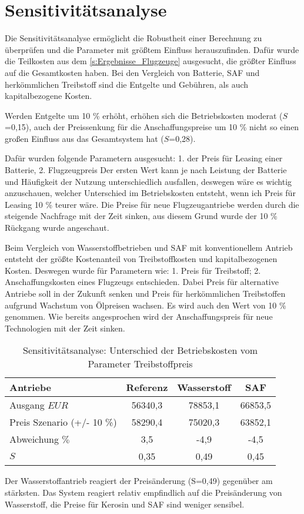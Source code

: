 \section{Sensitivitätsanalyse}
\label{s:Sensitivitätsanalyse}
%
Die Sensitivitätsanalyse ermöglicht die Robustheit einer Berechnung zu überprüfen und die Parameter mit größtem Einfluss herauszufinden. 
Dafür wurde die Teilkosten aus dem \ref{s:Ergebnisse_Flugzeuge} ausgesucht, die größter Einfluss auf die Gesamtkosten haben. 
Bei den Vergleich von Batterie, SAF und herkömmlichen Treibstoff sind die Entgelte und Gebühren, als auch kapitalbezogene Kosten.

Werden Entgelte um 10 \% erhöht, erhöhen sich die Betriebskosten moderat ($S$=0,15), auch der Preissenkung für die Anschaffungspreise
um 10 \% nicht so einen großen Einfluss aus das Gesamtsystem hat ($S$=0,28).

Dafür wurden folgende Parametern ausgesucht: 1. der Preis für Leasing einer Batterie, 2. Flugzeugpreis
Der ersten Wert kann je nach Leistung der Batterie und Häufigkeit der Nutzung unterschiedlich ausfallen, deswegen wäre es wichtig anzuschauen,
welcher Unterschied im Betriebskosten entsteht, wenn ich Preis für Leasing 10 \% teurer wäre. Die Preise für neue Flugzeugantriebe
werden durch die steigende Nachfrage mit der Zeit sinken, aus diesem Grund wurde der 10 \% Rückgang wurde angeschaut.


Beim Vergleich von Wasserstoffbetrieben und SAF mit konventionellem Antrieb entsteht der größte Kostenanteil
von Treibstoffkosten und kapitalbezogenen Kosten. Deswegen wurde für Parametern wie: 1. Preis für Treibstoff; 
2. Anschaffungskosten eines Flugzeugs entschieden. Dabei Preis für alternative Antriebe soll in der Zukunft senken und Preis für herkömmlichen
Treibstoffen aufgrund Wachstum von Ölpreisen wachsen. Es wird auch den Wert von 10 \% genommen.
Wie bereits angesprochen wird der Anschaffungspreis für neue Technologien mit der Zeit sinken.

\begin{table}[h]
	\begin{center}
    \caption{Sensitivitätsanalyse: Unterschied der Betriebskosten vom Parameter Treibstoffpreis}
	\label{BA_Infrastrukturtab}
	\begin{tabular}{|l|c|c|c|}
		\hline
		Antriebe & \textbf{Referenz}& \textbf{Wasserstoff}& \textbf{SAF} \\ \hline
		Ausgang $EUR$ & 56340,3 & 78853,1 & 66853,5  \\ \hline
        Preis Szenario (+/- 10 \%) & 58290,4  & 75020,3 & 63852,1 \\ \hline
        Abweichung $\%$ & 3,5 & -4,9 & -4,5 \\ \hline
		$S$ & 0,35 & 0,49 & 0,45 \\ \hline
	\end{tabular}
    \end{center}
\end{table}

Der Wasserstoffantrieb reagiert der Preisänderung (S=0,49) gegenüber am stärksten. Das System reagiert relativ 
empfindlich auf die Preisänderung von Wasserstoff, die Preise für Kerosin und SAF sind weniger sensibel.
